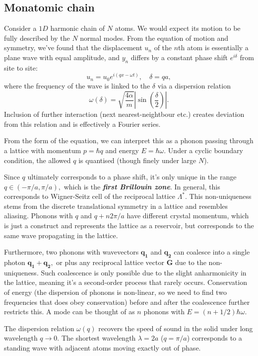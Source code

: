 \documentclass{article}
\theoremstyle{nonumberplain}
\begin{document}
\subsection{Monatomic chain}
Consider a $1D$ harmonic chain of $N$ atoms. We would expect its motion to be fully described by the $N$ normal modes. From the equation of motion and symmetry, we've found that the displacement $u_n$ of the $n$th atom is essentially a plane wave with equal amplitude, and $y_n$ differs by a constant phase shift $e^{i \delta}$ from site to site:
\[
    \boxed{u_n = u_0 e^{i(q x - \omega t)}, \quad \delta  = q a}, 
\]
where the frequency of the wave is linked to the $\delta $ via a dispersion relation
\[
    \omega(\delta ) = \sqrt{\frac{4 \alpha }{m}} \left\vert \sin \left( \frac{\delta }{2}\right) \right\vert. 
\]
Inclusion of further interaction (next nearest-neightbour etc.) creates deviation from this relation and is effectively a Fourier series. 

From the form of the equation, we can interpret this as a phonon passing through a lattice with momentum $p = \hbar q$ and energy $E = \hbar \omega.$ Under a cyclic boundary condition, the allowed $q$ is quantised (though finely under large $N$).

Since $q$ ultimately corresponds to a phase shift, it's only unique in the range $q \in (-\pi /a, \pi /a),$ which is the \textit{\textbf{first Brillouin zone}}. In general, this corresponds to Wigner-Seitz cell of the reciprocal lattice $\Lambda^{*}.$ This non-uniqueness stems from the discrete translational symmetry in a lattice and resembles aliasing. Phonons with $q$ and $q + n 2\pi /a$ have different crystal momentum, which is just a construct and represents the lattice as a reservoir, but corresponds to the same wave propagating in the lattice. 

Furthermore, two phonons with wavevectors $\mathbf{q_1} $ and $\mathbf{q_2} $ can coalesce into a single photon $\mathbf{q_1} + \mathbf{q_2} ,$ or plus any reciprocal lattice vector $\mathbf{G} $ due to the non-uniqueness. Such coalescence is only possible due to the slight anharmonicity in the lattice, meaning it's a second-order process that rarely occurs. Conservation of energy (the dispersion of phonons is non-linear, so we need to find two frequencies that does obey conservation) before and after the coalescence further restricts this. A mode can be thought of as $n$ phonons with $E = (n + 1 / 2) \hbar \omega.$

The dispersion relation $\omega(q)$ recovers the speed of sound in the solid under long wavelength $q \to 0.$ The shortest wavelength $\lambda  = 2a$ ($q = \pi /a$) corresponds to a standing wave with adjacent atoms moving exactly out of phase. 
\end{document}
